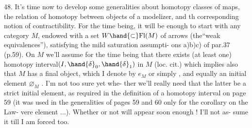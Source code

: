 48. It's time now to develop some generalities about homotopy classes
of maps, the relation of homotopy between objects of a modelizer, and th%
corresponding notion of contractibility. For the time being, it will be
enough to start with any category $M$, endowed with a set $W \hand{\subset} \mathrm{Fl}(M)$ of
arrows (the``weak equivalences''), satisfying the mild saturation assumpti-%
ons a)b)c) of par.37 (p.59). On $M$ we'll assume for the time being that
there exists (at least one) homotopy interval\deleted{\unsure{,}}$(I,\hand{\delta}_0,\hand{\delta}_1)$ in $M$ (loc. cit.)
which implies also that $M$ has a final object, which I denote by $e_M$ or
simply  , and equally an initial element $\varnothing_M$ . I'm not too sure yet whe-%
ther we'll really need that the latter be a strict initial element, as
required in the definition of a homotopy interval on page 59 (it was used
in the generalities of pages 59 and 60 only for the corollary on the Law-%
vere element ...). Whether or not will appear soon enough ! I'll not as-%
sume it till I am forced too. 
